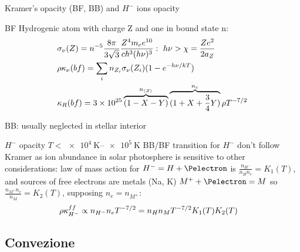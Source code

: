 \begin{frame}{Kramer's opacity (BF, BB) and $H^-$ ions opacity}
\begin{block}{BF}
Hydrogenic atom with charge Z and one \Pelectron in bound state n:
\begin{align*}
&\sigma_{\nu}(Z)=n\expy{-5}\frac{8\pi}{3\sqrt{3}}\frac{Z^4m_ee\expy{10}}{c\hbar^3(h\nu)^3}:\ h\nu>\chi=\frac{Ze^2}{2a_Z}\\
&\rho\kappa_{\nu}(bf)=\sum_in_{Z_i}\sigma_{\nu}(Z_i)(1-\exp{-h\nu/kT})\\
&\kappa_R(bf)=\num{3e25}\overbrace{(1-X-Y)}^{n_{\exv{Z}}}\overbrace{(1+X+\frac{3}{4}Y)}^{n_e}\rho T\expy{-7/2}
\end{align*}
\end{block}
\begin{block}{BB: usually neglected in stellar interior}
\end{block}
\begin{block}{$H^-$ opacity $T<\SIrange{e4}{e5}{\kelvin}$}
BB/BF transition for $H^-$ don't follow Kramer as ion abundance in solar photosphere is sensitive to other considerations: law of mass action for $H^-=H+\Pelectron$ is $\frac{n_{H^-}}{n_Hn_e}=K_1(T)$, and sources of free electrons are metals (Na, K) $M^++\Pelectron=M$ so $\frac{n_{M^+}n_e}{n_M}=K_2(T)$, supposing $n_e=n_{M^+}$:
\begin{align*}
&\rho\kappa_{H^-}^{ff}\propto n_{H^-}n_eT^{-7/2}=n_Hn_MT^{-7/2}K_1(T)K_2(T)
\end{align*}
\end{block}
\end{frame}

\subsection{Convezione}

